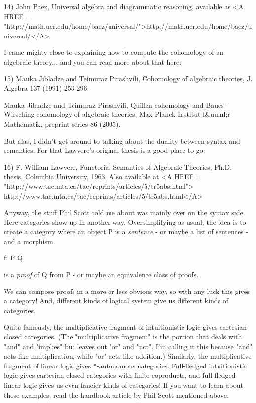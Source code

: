 14) John Baez, Universal algebra and diagrammatic reasoning, available
as <A HREF = "http://math.ucr.edu/home/baez/universal/">http://math.ucr.edu/home/baez/universal/</A>

I came mighty close to explaining how to compute the cohomology of
an algebraic theory... and you can read more about that here:

15) Mauka Jibladze and Teimuraz Pirashvili, Cohomology of algebraic 
theories, J. Algebra 137 (1991) 253-296.

Mauka Jibladze and Teimuraz Pirashvili, Quillen cohomology and 
Baues-Wirsching cohomology of algebraic theories, Max-Planck-Institut 
f&uuml;r Mathematik, preprint series 86 (2005).

But alas, I didn't get around to talking about the duality between 
syntax and semantics.  For that Lawvere's original thesis is a good
place to go:

16) F. William Lawvere, Functorial Semantics of Algebraic Theories,
Ph.D. thesis, Columbia University, 1963.  Also available at
<A HREF = "http://www.tac.mta.ca/tac/reprints/articles/5/tr5abs.html">
http://www.tac.mta.ca/tac/reprints/articles/5/tr5abs.html</A>

Anyway, the stuff Phil Scott told me about was mainly over on the
syntax side.  Here categories show up in another way.  Oversimplifying
as usual, the idea is to create a category where an object P is a
\emph{sentence} - or maybe a list of sentences - and a morphism

f: P \to  Q

is a \emph{proof} of Q from P - or maybe an equivalence class of proofs.

We can compose proofs in a more or less obvious way, so with any 
luck this gives a category!  And, different kinds of logical system 
give us different kinds of categories.  

Quite famously, the
multiplicative fragment of
intuitionistic logic gives cartesian closed categories.
(The "multiplicative fragment"
is the portion that deals with "and"
and "implies" but leaves out "or" and "not".
I'm calling it this because "and" acts like multiplication,
while "or" acts like addition.)   
Similarly, 
the multiplicative fragment of linear logic gives *-autonomous 
categories.  
Full-fledged intuitionistic logic gives cartesian closed categories
with finite coproducts, and
full-fledged linear logic gives us even fancier kinds of categories!
If you want to learn about these examples, read the handbook article by 
Phil Scott mentioned above.


